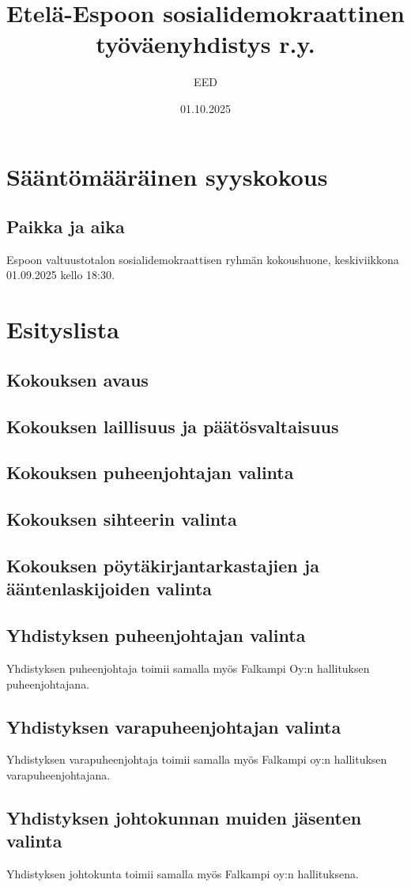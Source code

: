 \documentclass[a4paper,12pt]{article}
\title{Etelä-Espoon sosialidemokraattinen työväenyhdistys r.y.}
\author{EED}
\date{01.10.2025}
\begin{document}
\maketitle
\tableofcontents
\section*{Sääntömääräinen syyskokous}
\subsection*{Paikka ja aika}
Espoon valtuustotalon sosialidemokraattisen ryhmän kokoushuone, keskiviikkona 01.09.2025 kello 18:30.
\section*{Esityslista}
\subsection{Kokouksen avaus}
\subsection{Kokouksen laillisuus ja päätösvaltaisuus}
\subsection{Kokouksen puheenjohtajan valinta}
\subsection{Kokouksen sihteerin valinta}
\subsection{Kokouksen pöytäkirjantarkastajien ja ääntenlaskijoiden valinta}
\subsection{Yhdistyksen puheenjohtajan valinta}
Yhdistyksen puheenjohtaja toimii samalla myös Falkampi Oy:n hallituksen puheenjohtajana.
\subsection{Yhdistyksen varapuheenjohtajan valinta}
Yhdistyksen varapuheenjohtaja toimii samalla myös Falkampi oy:n hallituksen varapuheenjohtajana.
\subsection{Yhdistyksen johtokunnan muiden jäsenten valinta}
Yhdistyksen johtokunta toimii samalla myös Falkampi oy:n hallituksena.
\end{document}
